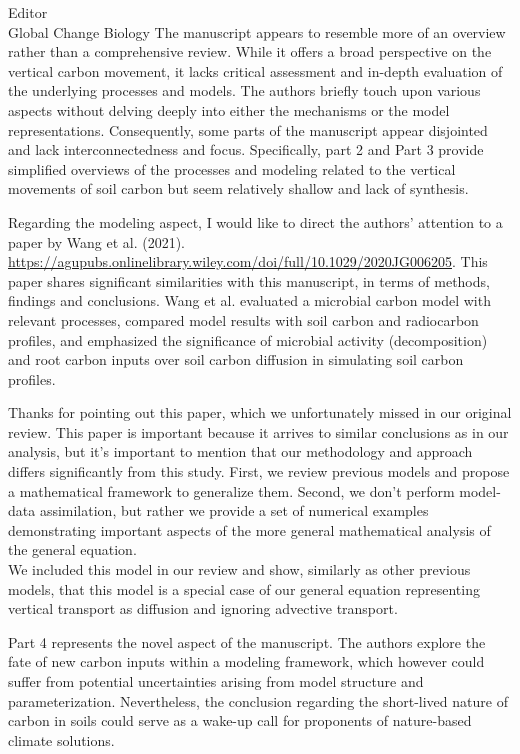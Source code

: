 \documentclass[11pt]{bgcletter}
\newcommand{\answer}[1] {
{\color{cyan} #1}
}
\begin{document}
\begin{letter}{Editor\\
   Global Change Biology
}
The manuscript appears to resemble more of an overview rather than a comprehensive review. While it offers a broad perspective on the vertical carbon movement, it lacks critical assessment and in-depth evaluation of the underlying processes and models. The authors briefly touch upon various aspects without delving deeply into either the mechanisms or the model representations. Consequently, some parts of the manuscript appear disjointed and lack interconnectedness and focus. Specifically, part 2 and Part 3 provide simplified overviews of the processes and modeling related to the vertical movements of soil carbon but seem relatively shallow and lack of synthesis. 

Regarding the modeling aspect, I would like to direct the authors' attention to a paper by Wang et al. (2021). 
\url{https://agupubs.onlinelibrary.wiley.com/doi/full/10.1029/2020JG006205}. This paper shares significant similarities with this manuscript, in terms of methods, findings and conclusions. Wang et al. evaluated a microbial carbon model with relevant processes, compared model results with soil carbon and radiocarbon profiles, and emphasized the significance of microbial activity (decomposition) and root carbon inputs over soil carbon diffusion in simulating soil carbon profiles.

\answer{Thanks for pointing out this paper, which we unfortunately missed in our original review. This paper is important because it arrives to similar conclusions as in our analysis, but it's important to mention that our methodology and approach differs significantly from this study. First, we review previous models and propose a mathematical framework to generalize them. Second, we don't perform model-data assimilation, but rather we provide a set of numerical examples demonstrating important aspects of the more general mathematical analysis of the general equation. \\ We included this model in our review and show, similarly as other previous models, that this model is a special case of our general equation representing vertical transport as diffusion and ignoring advective transport. }

Part 4 represents the novel aspect of the manuscript. The authors explore the fate of new carbon inputs within a modeling framework, which however could suffer from potential uncertainties arising from model structure and parameterization. Nevertheless, the conclusion regarding the short-lived nature of carbon in soils could serve as a wake-up call for proponents of nature-based climate solutions.


\end{letter}
\end{document}
